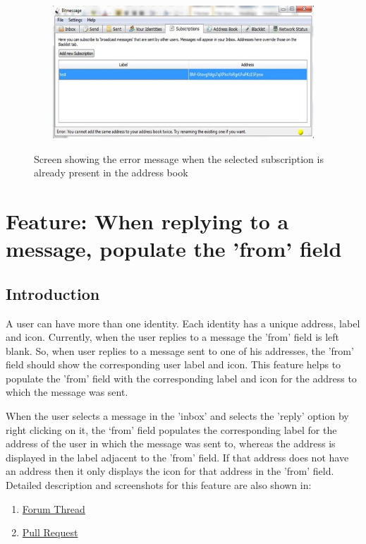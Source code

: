 \documentclass[12pt]{article}
\begin{document}
\begin{figure}[H]
\begin{center}
    {\label{fig:1} \includegraphics[width=12cm,height=5cm]{F1_3.jpg}}   
  \centering  \caption{Screen showing the error message when the selected subscription is already present in the address book}
  \end{center}
\end{figure}

\section{Feature: When replying to a message, populate the 'from' field}

\subsection{Introduction}
A user can have more than one identity. Each identity has a unique address, label and icon. Currently, when the user replies to a message the 'from' field is left blank.  So, when user replies to a message sent to one of his addresses, the 'from' field should show the corresponding user label and icon. This feature helps to populate the 'from' field with the corresponding label and icon for the address to which the message was sent. 

When the user selects a message in the 'inbox' and selects the 'reply' option by right clicking on it, the ‘from’ field populates the corresponding label for the address of the user in which the message was sent to, whereas the address is displayed in the label adjacent to the 'from' field. If that address does not have an address then it only displays the icon for that address in the 'from' field. Detailed description and screenshots for this feature are also shown in:
\begin{enumerate}
\item \href{https://bitmessage.org/forum/index.php?topic=3384.0}{Forum Thread} 
\item \href{https://github.com/Bitmessage/PyBitmessage/pull/581}{Pull Request} 

\end{enumerate}
\end{document}
